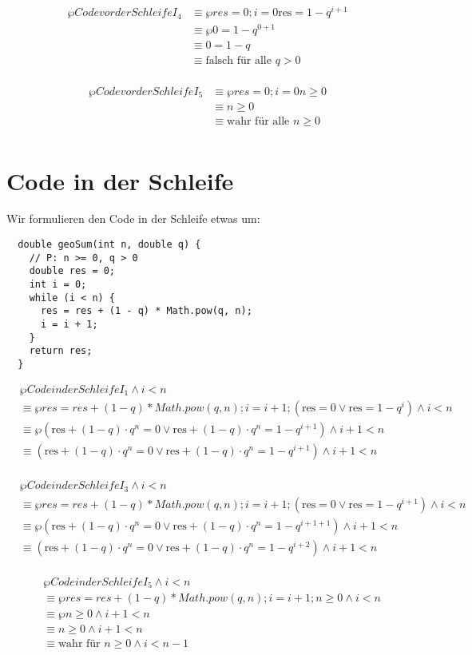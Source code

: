 \documentclass{lehramt-informatik-minimal}
\begin{document}
\begin{align*}
\wp{Code vor der Schleife}{I_4}
& \equiv \wp{res = 0; i = 0}{\text{res} = 1 - q^{i+1}} \\
& \equiv \wp{}{0 = 1 - q^{0+1}} \\
& \equiv 0 = 1 - q \\
& \equiv \text{falsch für alle } q > 0\\
\end{align*}

\begin{align*}
\wp{Code vor der Schleife}{I_5}
& \equiv \wp{res = 0; i = 0}{n \geq 0} \\
& \equiv n \geq 0 \\
& \equiv \text{wahr für alle } n \geq 0\\
\end{align*}

\section{Code in der Schleife}

Wir formulieren den Code in der Schleife etwas um:

\begin{verbatim}
  double geoSum(int n, double q) {
    // P: n >= 0, q > 0
    double res = 0;
    int i = 0;
    while (i < n) {
      res = res + (1 - q) * Math.pow(q, n);
      i = i + 1;
    }
    return res;
  }
\end{verbatim}

\begin{align*}
&\wp{Code in der Schleife}{I_1 \land i < n}\\
&\equiv \wp{res = res + (1-q) * Math.pow(q, n); i = i + 1;}
{(\text{res} = 0 \lor \text{res} = 1 - q^i) \land i < n} \\
&\equiv \wp{}
{(\text{res} + (1-q) \cdot q^n = 0 \lor \text{res} + (1-q) \cdot q^n = 1 - q^{i + 1}) \land i + 1 < n} \\
&\equiv
(\text{res} + (1-q) \cdot q^n = 0 \lor \text{res} + (1-q) \cdot q^n = 1 - q^{i + 1}) \land i + 1 < n \\
\end{align*}

\begin{align*}
&\wp{Code in der Schleife}{I_3 \land i < n}\\
& \equiv \wp{res = res + (1-q) * Math.pow(q, n); i = i + 1;}
{(\text{res} = 0 \lor \text{res} = 1 - q^{i+1}) \land i < n} \\
& \equiv \wp{}
{(\text{res} + (1-q) \cdot q^n = 0 \lor \text{res} + (1-q) \cdot q^n  = 1 - q^{i + 1 + 1}) \land i + 1 < n} \\
& \equiv
(\text{res} + (1-q) \cdot q^n = 0 \lor \text{res} + (1-q) \cdot q^n  = 1 - q^{i + 2}) \land i + 1 < n \\
\end{align*}

\begin{align*}
&\wp{Code in der Schleife}{I_5 \land i < n}\\
& \equiv \wp{res = res + (1-q) * Math.pow(q, n); i = i + 1;}{n \geq 0 \land i < n} \\
& \equiv \wp{}{n \geq 0 \land i + 1 < n} \\
& \equiv n \geq 0 \land i + 1 < n \\
& \equiv \text{wahr für }n \geq 0 \land i < n - 1 \\
\end{align*}
\end{document}
